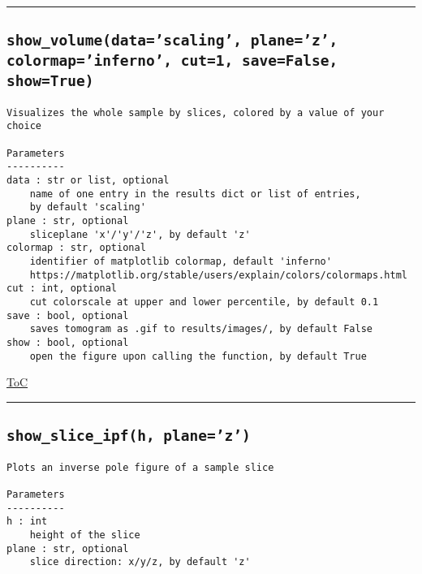 \documentclass{article}
\begin{document}


\vspace{5mm}

\hrule

\subsection*{\texttt{show\_volume(data='scaling', plane='z', colormap='inferno', cut=1, save=False, show=True)}}
\label{fun:showvolume}

\begin{lstlisting}[language=docstring]
Visualizes the whole sample by slices, colored by a value of your choice

Parameters
----------
data : str or list, optional
    name of one entry in the results dict or list of entries, 
    by default 'scaling'
plane : str, optional
    sliceplane 'x'/'y'/'z', by default 'z'
colormap : str, optional
    identifier of matplotlib colormap, default 'inferno'
    https://matplotlib.org/stable/users/explain/colors/colormaps.html
cut : int, optional
    cut colorscale at upper and lower percentile, by default 0.1
save : bool, optional
    saves tomogram as .gif to results/images/, by default False
show : bool, optional
    open the figure upon calling the function, by default True
\end{lstlisting}

\begin{flushright}

\hyperref[toc]{ToC}

\end{flushright}



\vspace{5mm}

\hrule

\subsection*{\texttt{show\_slice\_ipf(h, plane='z')}}
\label{fun:showsliceipf}

\begin{lstlisting}[language=docstring]
Plots an inverse pole figure of a sample slice

Parameters
----------
h : int
    height of the slice
plane : str, optional
    slice direction: x/y/z, by default 'z'
\end{lstlisting}
\end{document}

